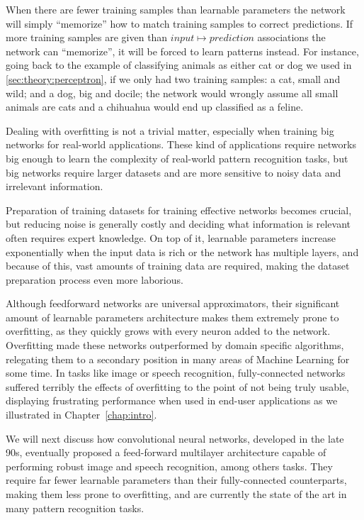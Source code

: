 When there are fewer training samples than learnable parameters the network will simply ``memorize'' how to match training samples to correct predictions.
If more training samples are given than $input \mapsto prediction$ associations the network can ``memorize'', it will be forced to learn patterns instead.
For instance, going back to the example of classifying animals as either cat or dog we used in \autoref{sec:theory:perceptron}, if we only had two training samples: a cat, small and wild; and a dog, big and docile; the network would wrongly assume all small animals are cats and a chihuahua would end up classified as a feline.

Dealing with overfitting is not a trivial matter, especially when training big networks for real-world applications.
These kind of applications require networks big enough to learn the complexity of real-world pattern recognition tasks, but big networks require larger datasets and are more sensitive to noisy data and irrelevant information.

Preparation of training datasets for training effective networks becomes crucial, but reducing noise is generally costly and deciding what information is relevant often requires expert knowledge.
On top of it, learnable parameters increase exponentially when the input data is rich or the network has multiple layers, and because of this, vast amounts of training data are required, making the dataset preparation process even more laborious.

Although feedforward networks are universal approximators, their significant amount of learnable parameters architecture makes them extremely prone to overfitting, as they quickly grows with every neuron added to the network.
Overfitting made these networks outperformed by domain specific algorithms, relegating them to a secondary position in many areas of Machine Learning for some time.
In tasks like image or speech recognition, fully-connected networks suffered terribly the effects of overfitting to the point of not being truly usable, displaying frustrating performance when used in end-user applications as we illustrated in Chapter~\ref{chap:intro}.

We will next discuss how convolutional neural networks, developed in the late 90s, eventually proposed a feed-forward multilayer architecture capable of performing robust image and speech recognition, among others tasks.
They require far fewer learnable parameters than their fully-connected counterparts, making them less prone to overfitting, and are currently the state of the art in many pattern recognition tasks.


